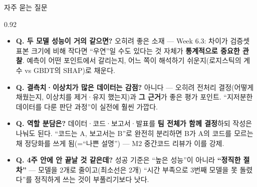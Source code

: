 \begin{frame}{자주 묻는 질문}
\begin{center}\begin{varwidth}{0.92\textwidth}
  \begin{itemize}
    \item \textbf{Q. 두 모델 성능이 거의 같으면?} 오히려 좋은 소재
      --- Week 6.3: 차이가 검증셋 표본 크기에 비해 작다면
      ``우연''일 수도 있다는 것 자체가 \textbf{통계적으로 중요한
      관찰}. 예측이 어떤 포인트에서 갈리는지, 어느 쪽이 해석하기
      쉬운지(로지스틱의 계수 vs GBDT의 SHAP)로 채운다.
    \item \textbf{Q. 결측치·이상치가 많은 데이터는 감점?} 아니다
      --- 오히려 전처리 결정(어떻게 채웠는지, 이상치를 제거·유지
      했는지)과 \textbf{그 근거}가 좋은 평가 포인트. ``지저분한
      데이터를 다룬 판단 과정''이 실전에 훨씬 가깝다.
    \item \textbf{Q. 역할 분담은?} 데이터·코드·보고서·발표를
      \textbf{팀 전체가 함께 결정}하되 작성은 나눠도 된다.
      ``코드는 A, 보고서는 B''로 완전히 분리하면 B가 A의 코드를
      모르는 채 정당화를 쓰게 됨(=``나쁜 설명'') --- M2
      중간코드 리뷰가 이를 강제.
    \item \textbf{Q. 4주 안에 안 끝날 것 같은데?} 성공 기준은
      ``높은 성능''이 아니라 \textbf{``정직한 절차''} --- 모델을
      2개로 줄이고(최소선은 2개) ``시간 부족으로 3번째 모델을
      못 돌렸다''를 정직하게 쓰는 것이 부풀리기보다 낫다.
  \end{itemize}
\end{varwidth}\end{center}
\end{frame}
